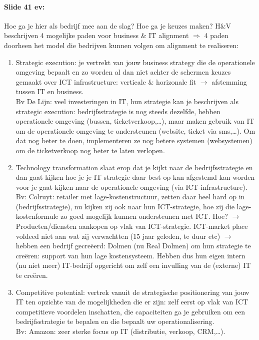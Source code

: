 \documentclass[10pt,a4paper]{report}
\begin{document}
\paragraph{Slide 41 ev:}Hoe ga je hier als bedrijf mee aan de slag? Hoe ga je keuzes maken? H\&V beschrijven 4 mogelijke paden voor business \& IT alignment $\Rightarrow$ 4 paden doorheen het model die bedrijven kunnen volgen om alignment te realiseren:
\begin{enumerate}
\item Strategic execution: je vertrekt van jouw business strategy die de operationele omgeving bepaalt en zo worden al dan niet achter de schermen keuzes gemaakt over ICT infrastructure: verticale \& horizonale fit $\rightarrow$ afstemming tussen IT en business.\\
Bv De Lijn: veel investeringen in IT, hun strategie kan je beschrijven als strategic execution: bedrijfsstrategie is nog steeds dezelfde, hebben operationele omgeving (bussen, ticketverkoop,…), maar maken gebruik van IT om de operationele omgeving te ondersteunen (website, ticket via sms,…). 
Om dat nog beter te doen, implementeren ze nog betere systemen (websystemen) om de ticketverkoop nog beter te laten verlopen. 
\item Technology transformation slaat erop dat je kijkt naar de bedrijfsstrategie en dan gaat kijken hoe je je IT-strategie daar best op kan afgestemd kan worden voor je gaat kijken naar de operationele omgeving (via ICT-infrastructure).\\ 
Bv: Colruyt: retailer met lage-kostenstructuur, zetten daar heel hard op in (bedrijfsstrategie), nu kijken zij ook naar hun ICT-strategie, hoe zij die lage-kostenformule zo goed mogelijk kunnen ondersteunen met ICT. 
Hoe? $\rightarrow$ Producten/diensten aankopen op vlak van ICT-strategie. 
ICT-market place voldeed niet aan wat zij verwachtten (15 jaar geleden, te duur etc) $\rightarrow$ hebben een bedrijf gecreëerd: Dolmen (nu Real Dolmen) om hun strategie te creëren: support van hun lage kostensysteem. 
Hebben dus hun eigen intern (nu niet meer) IT-bedrijf opgericht om zelf een invulling van de (externe) IT te creëren.
\item Competitive potential: vertrek vanuit de strategische positionering van jouw IT ten opzichte van de mogelijkheden die er zijn: zelf eerst op vlak van ICT competitieve voordelen inschatten, die capaciteiten ga je gebruiken om een bedrijfsstrategie te bepalen en die bepaalt uw operationalisering.\\ 
Bv: Amazon: zeer sterke focus op IT (distributie, verkoop, CRM,…).

\end{enumerate}
\end{document}
